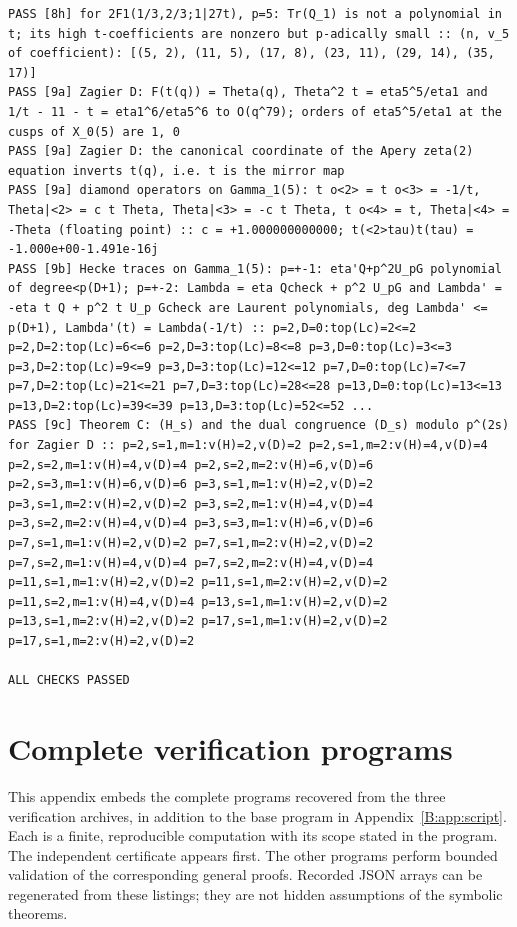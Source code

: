 \documentclass[11pt,a4paper]{article}
\theoremstyle{definition}\newtheorem{definition}[theorem]{Definition}
\theoremstyle{remark}\newtheorem{remark}[theorem]{Remark}
\numberwithin{equation}{section}
\begin{document}
\begin{lstlisting}
PASS [8h] for 2F1(1/3,2/3;1|27t), p=5: Tr(Q_1) is not a polynomial in t; its high t-coefficients are nonzero but p-adically small :: (n, v_5 of coefficient): [(5, 2), (11, 5), (17, 8), (23, 11), (29, 14), (35, 17)]
PASS [9a] Zagier D: F(t(q)) = Theta(q), Theta^2 t = eta5^5/eta1 and 1/t - 11 - t = eta1^6/eta5^6 to O(q^79); orders of eta5^5/eta1 at the cusps of X_0(5) are 1, 0
PASS [9a] Zagier D: the canonical coordinate of the Apery zeta(2) equation inverts t(q), i.e. t is the mirror map
PASS [9a] diamond operators on Gamma_1(5): t o<2> = t o<3> = -1/t, Theta|<2> = c t Theta, Theta|<3> = -c t Theta, t o<4> = t, Theta|<4> = -Theta (floating point) :: c = +1.000000000000; t(<2>tau)t(tau) = -1.000e+00-1.491e-16j
PASS [9b] Hecke traces on Gamma_1(5): p=+-1: eta'Q+p^2U_pG polynomial of degree<p(D+1); p=+-2: Lambda = eta Qcheck + p^2 U_pG and Lambda' = -eta t Q + p^2 t U_p Gcheck are Laurent polynomials, deg Lambda' <= p(D+1), Lambda'(t) = Lambda(-1/t) :: p=2,D=0:top(Lc)=2<=2 p=2,D=2:top(Lc)=6<=6 p=2,D=3:top(Lc)=8<=8 p=3,D=0:top(Lc)=3<=3 p=3,D=2:top(Lc)=9<=9 p=3,D=3:top(Lc)=12<=12 p=7,D=0:top(Lc)=7<=7 p=7,D=2:top(Lc)=21<=21 p=7,D=3:top(Lc)=28<=28 p=13,D=0:top(Lc)=13<=13 p=13,D=2:top(Lc)=39<=39 p=13,D=3:top(Lc)=52<=52 ...
PASS [9c] Theorem C: (H_s) and the dual congruence (D_s) modulo p^(2s) for Zagier D :: p=2,s=1,m=1:v(H)=2,v(D)=2 p=2,s=1,m=2:v(H)=4,v(D)=4 p=2,s=2,m=1:v(H)=4,v(D)=4 p=2,s=2,m=2:v(H)=6,v(D)=6 p=2,s=3,m=1:v(H)=6,v(D)=6 p=3,s=1,m=1:v(H)=2,v(D)=2 p=3,s=1,m=2:v(H)=2,v(D)=2 p=3,s=2,m=1:v(H)=4,v(D)=4 p=3,s=2,m=2:v(H)=4,v(D)=4 p=3,s=3,m=1:v(H)=6,v(D)=6 p=7,s=1,m=1:v(H)=2,v(D)=2 p=7,s=1,m=2:v(H)=2,v(D)=2 p=7,s=2,m=1:v(H)=4,v(D)=4 p=7,s=2,m=2:v(H)=4,v(D)=4 p=11,s=1,m=1:v(H)=2,v(D)=2 p=11,s=1,m=2:v(H)=2,v(D)=2 p=11,s=2,m=1:v(H)=4,v(D)=4 p=13,s=1,m=1:v(H)=2,v(D)=2 p=13,s=1,m=2:v(H)=2,v(D)=2 p=17,s=1,m=1:v(H)=2,v(D)=2 p=17,s=1,m=2:v(H)=2,v(D)=2

ALL CHECKS PASSED
\end{lstlisting}


\clearpage
\section{Complete verification programs}\label{app:all-programs}
This appendix embeds the complete programs recovered from the three verification archives, in addition to the base program in Appendix~\ref{B:app:script}. Each is a finite, reproducible computation with its scope stated in the program. The independent certificate appears first. The other programs perform bounded validation of the corresponding general proofs. Recorded JSON arrays can be regenerated from these listings; they are not hidden assumptions of the symbolic theorems.
\end{document}
